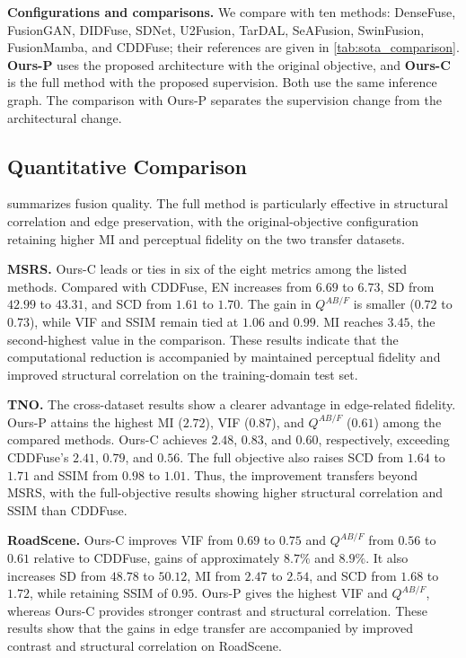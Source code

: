 \textbf{Configurations and comparisons.}
We compare with ten methods: DenseFuse, FusionGAN, DIDFuse, SDNet, U2Fusion, TarDAL, SeAFusion, SwinFusion, FusionMamba, and CDDFuse; their references are given in \cref{tab:sota_comparison}. \textbf{Ours-P} uses the proposed architecture with the original objective, and \textbf{Ours-C} is the full method with the proposed supervision. Both use the same inference graph. The comparison with Ours-P separates the supervision change from the architectural change.

\subsection{Quantitative Comparison}\label{subsec:sota_comparison}
 summarizes fusion quality. The full method is particularly effective in structural correlation and edge preservation, with the original-objective configuration retaining higher MI and perceptual fidelity on the two transfer datasets.

\textbf{MSRS.}
Ours-C leads or ties in six of the eight metrics among the listed methods. Compared with CDDFuse, EN increases from $6.69$ to $6.73$, SD from $42.99$ to $43.31$, and SCD from $1.61$ to $1.70$. The gain in $Q^{AB/F}$ is smaller ($0.72$ to $0.73$), while VIF and SSIM remain tied at $1.06$ and $0.99$. MI reaches $3.45$, the second-highest value in the comparison. These results indicate that the computational reduction is accompanied by maintained perceptual fidelity and improved structural correlation on the training-domain test set.

\textbf{TNO.}
The cross-dataset results show a clearer advantage in edge-related fidelity. Ours-P attains the highest MI ($2.72$), VIF ($0.87$), and $Q^{AB/F}$ ($0.61$) among the compared methods. Ours-C achieves $2.48$, $0.83$, and $0.60$, respectively, exceeding CDDFuse's $2.41$, $0.79$, and $0.56$. The full objective also raises SCD from $1.64$ to $1.71$ and SSIM from $0.98$ to $1.01$. Thus, the improvement transfers beyond MSRS, with the full-objective results showing higher structural correlation and SSIM than CDDFuse.

\textbf{RoadScene.}
Ours-C improves VIF from $0.69$ to $0.75$ and $Q^{AB/F}$ from $0.56$ to $0.61$ relative to CDDFuse, gains of approximately $8.7\%$ and $8.9\%$. It also increases SD from $48.78$ to $50.12$, MI from $2.47$ to $2.54$, and SCD from $1.68$ to $1.72$, while retaining SSIM of $0.95$. Ours-P gives the highest VIF and $Q^{AB/F}$, whereas Ours-C provides stronger contrast and structural correlation. These results show that the gains in edge transfer are accompanied by improved contrast and structural correlation on RoadScene.

